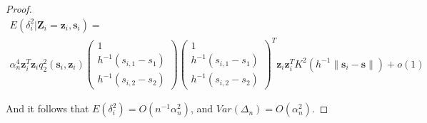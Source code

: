 \documentclass[authoryear,review, 12pt]{elsarticle}
\begin{document}
\begin{proof}
\begin{multline*}
E\left(\delta_{i}^{2}|\bm{Z}_{i}=\bm{z}_{i},\bm{s}_{i}\right)=\\
\alpha_{n}^{4}\bm{z}_{i}^{T}\bm{z}_{i}q_{2}^{2}(\bm{s}_{i},\bm{z}_{i})\left(\begin{array}{c}
1\\
h^{-1}(s_{i,1}-s_{1})\\
h^{-1}(s_{i,2}-s_{2})
\end{array}\right)\left(\begin{array}{c}
1\\
h^{-1}(s_{i,1}-s_{1})\\
h^{-1}(s_{i,2}-s_{2})
\end{array}\right)^{T}\bm{z}_{i}\bm{z}_{i}^{T}K^{2}\left(h^{-1}\|\bm{s}_{i}-\bm{s}\|\right)+o\left(1\right)
\end{multline*}


And it follows that $E\left(\delta_{i}^{2}\right)=O\left(n^{-1}\alpha_{n}^{2}\right)$,
and $Var\left(\Delta_{n}\right)=O\left(\alpha_{n}^{2}\right)$.
\end{proof}



\end{document}
